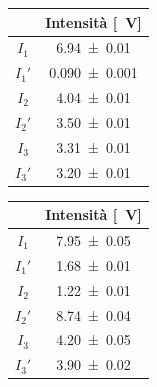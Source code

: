 \documentclass[10pt,oneside,a4paper]{article}
\newenvironment{Figure}
  {\par\medskip\noindent\minipage{\linewidth}}
  {\endminipage\par\medskip}
\begin{document}
\vspace{1cm}
\begin{minipage}[t]{.5\linewidth}
\begin{center}
\label{tab:stokesBS}
\begin{tabular}{c|c}
& Intensità [\SI{}{V}]  \\
\hline
     $I_1$  &        \SI{6.94 \pm 0.01}{} \\
     $I_1'$  &       \SI{0.090 \pm 0.001}{} \\
     \hline 
     $I_2$  &        \SI{4.04 \pm 0.01}{} \\
     $I_2'$  &       \SI{3.50 \pm 0.01}{} \\
     \hline 
     $I_3$  &        \SI{3.31 \pm 0.01}{} \\
     $I_3'$	&		 \SI{3.20 \pm 0.01}{} \\
\hline
\end{tabular}
\end{center}
\end{minipage}
\hspace{1em}
\begin{minipage}[t]{.5\linewidth}
\begin{center}
\label{tab:stokesHeNe}
\begin{tabular}{c|c}
& Intensità [\SI{}{V}]  \\
\hline
     $I_1$  &        \SI{7.95 \pm 0.05}{} \\
     $I_1'$  &       \SI{1.68 \pm 0.01}{} \\
     \hline 
     $I_2$  &        \SI{1.22 \pm 0.01}{} \\
     $I_2'$  &       \SI{8.74 \pm 0.04}{} \\
     \hline 
     $I_3$  &        \SI{4.20 \pm 0.05}{} \\
     $I_3'$	&		 \SI{3.90 \pm 0.02}{} \\
\hline
\end{tabular}
\end{center}
\end{minipage}


\end{document}
